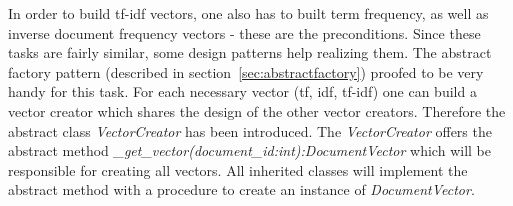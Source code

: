 In order to build tf-idf vectors, one also has to built term frequency, as well as inverse document frequency vectors - these are the preconditions.
Since these tasks are fairly similar, some design patterns help realizing them.
The abstract factory pattern (described in section~\ref{sec:abstractfactory}) proofed to be very handy for this task.
For each necessary vector (tf, idf, tf-idf) one can build a vector creator which shares the design of the other vector creators.
Therefore the abstract class \textit{VectorCreator} has been introduced.
The \textit{VectorCreator} offers the abstract method \textit{\_get\_vector(document\_id:int):DocumentVector} which will be responsible for creating all vectors.
All inherited classes will implement the abstract method with a procedure to create an instance of \textit{DocumentVector}.

